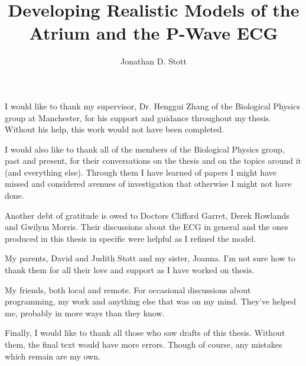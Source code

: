 \documentclass[12pt,PhD]{muthesis}
\begin{document}
    \title{Developing Realistic Models of the Atrium and the P-Wave ECG}
    \author{Jonathan D. Stott}

    \beforeabstract
    \singlespace
    
    \onehalfspace
    \afterabstract
I would like to thank my supervisor, Dr. Henggui Zhang of the Biological Physics
group at Manchester, for his support and guidance throughout my thesis.
Without his help, this work would not have been completed.

I would also like to thank all of the members of the Biological Physics group,
past and present, for their conversations on the thesis and on the topics around
it (and everything else).
Through them I have learned of papers I might have missed and considered avenues
of investigation that otherwise I might not have done.

Another debt of gratitude is owed to Doctors Clifford Garret, Derek Rowlands and
Gwilym Morris.
Their discussions about the ECG in general and the ones produced in this thesis
in specific were helpful as I refined the model.

My parents, David and Judith Stott and my sister, Joanna.
I'm not sure how to thank them for all their love and support as I have worked
on thesis.

My friends, both local and remote.
For occasional discussions about programming, my work and anything else that was
on my mind.
They've helped me, probably in more ways than they know.

Finally, I would like to thank all those who saw drafts of this thesis.
Without them, the final text would have more errors.
Though of course, any mistakes which remain are my own.


    \afterpreface
    

   
   
   
   
   
   

%    
    
\end{document}
